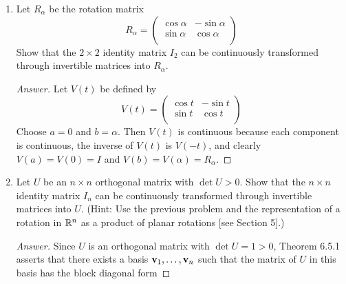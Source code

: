 \documentclass[../psets.tex]{subfiles}
\begin{document}
\begin{enumerate}[label={\textbf{6.\arabic*.}}]
\begin{proof}[Answer]
\begin{align*}
\begin{pmatrix}
                0 & 1\\
                1 & 0\\
            \end{pmatrix}\\
            &=
            \begin{pmatrix}
                \cos\alpha & \sin\alpha\\
                -\sin\alpha & \cos\alpha\\
            \end{pmatrix}
        \end{align*}
    \end{proof}
    \item Let $R_\alpha$ be the rotation matrix
    \begin{equation*}
        R_\alpha =
        \begin{pmatrix}
            \cos\alpha & -\sin\alpha\\
            \sin\alpha & \cos\alpha\\
        \end{pmatrix}
    \end{equation*}
    Show that the $2\times 2$ identity matrix $I_2$ can be continuously transformed through invertible matrices into $R_\alpha$.
    \begin{proof}[Answer]
        Let $V(t)$ be defined by
        \begin{equation*}
            V(t) =
            \begin{pmatrix}
                \cos t & -\sin t\\
                \sin t & \cos t\\
            \end{pmatrix}
        \end{equation*}
        Choose $a=0$ and $b=\alpha$. Then $V(t)$ is continuous because each component is continuous, the inverse of $V(t)$ is $V(-t)$, and clearly $V(a)=V(0)=I$ and $V(b)=V(\alpha)=R_\alpha$.
    \end{proof}
    \item Let $U$ be an $n\times n$ orthogonal matrix with $\det U>0$. Show that the $n\times n$ identity matrix $I_n$ can be continuously transformed through invertible matrices into $U$. (Hint: Use the previous problem and the representation of a rotation in $\mathbb{R}^n$ as a product of planar rotations [see Section 5].)
    \begin{proof}[Answer]
        Since $U$ is an orthogonal matrix with $\det U=1>0$, Theorem 6.5.1 asserts that there exists a basis $\mathbf{v}_1,\dots,\mathbf{v}_n$ such that the matrix of $U$ in this basis has the block diagonal form

\end{proof}
\end{enumerate}
\end{document}
